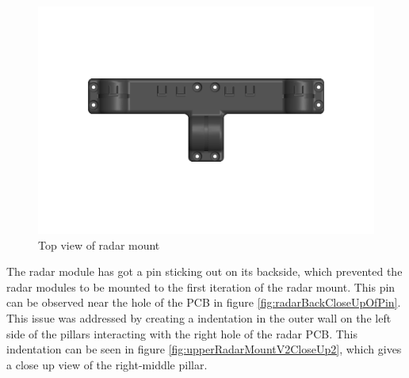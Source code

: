 \begin{figure}[H]
    \centering
    \includegraphics[scale=0.5]{Figures/CAD/upperRadarMountV2TopView.PNG}
    \caption{Top view of radar mount}
    \label{fig:upperRadarMountV2TopView}
\end{figure}

The radar module has got a pin sticking out on its backside, which prevented the radar modules to be mounted to the first iteration of the radar mount. This pin can be observed near the hole of the PCB in figure \ref{fig:radarBackCloseUpOfPin}. This issue was addressed by creating a indentation in the outer wall on the left side of the pillars interacting with the right hole of the radar PCB. This indentation can be seen in figure \ref{fig:upperRadarMountV2CloseUp2}, which gives a close up view of the right-middle pillar. %

